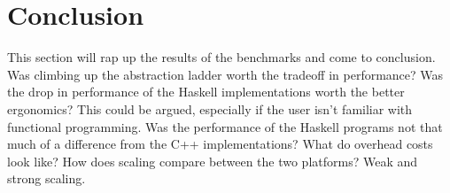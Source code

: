 \documentclass[a4paper, 10pt]{article}
\begin{document}
\section{Conclusion}
This section will rap up the results of the benchmarks and come to conclusion. Was climbing up the
 abstraction ladder worth the tradeoff in performance? Was the drop in performance of the Haskell implementations
 worth the better ergonomics? This could be argued, especially if the user isn't familiar with functional programming.
 Was the performance of the Haskell programs not that much of a difference from the C++ implementations? What do overhead costs look like?
 How does scaling compare between the two platforms? Weak and strong scaling.
\end{document}
